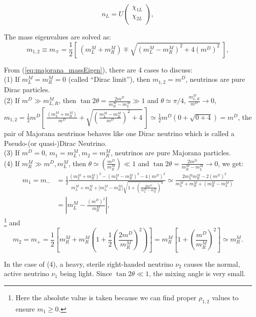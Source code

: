 \begin{equation}\label{eq:majorana_fields}
n_L=U
\begin{pmatrix}
\chi_{1L}\\
\chi_{2L}\\
\end{pmatrix},
\end{equation}

The mass eigenvalues are solved as:
\begin{equation}
m_{1,2}\equiv m_{\mp} = \frac{1}{2}[~(m_L^M+m_R^M)\mp\sqrt{(m_L^M-m_R^M)^2+4(m^D)^2}~]\label{eq:majorana_massEigen},
\end{equation}

From (\ref{eq:majorana_massEigen}), there are 4 cases to discuss:\\
(1) If $m_L^M=m_R^M=0$ (called ``Dirac limit''), then $m_{1,2}=m^D$, neutrinos are pure Dirac particles.\\
(2) If $m^D\gg m^M_{L,R}$, then $\tan 2\theta=\frac{2m^D}{m^M_R-m^M_L}\gg 1$ and $\theta\simeq \pi/4$, $\frac{m_{L,R}^M}{m^D}\to 0$, $m_{1,2}=\frac{1}{2}m^D[~\frac{(m_L^M+m_R^M)}{m^D}+\sqrt{(\frac{m^M_L-m^M_R}{m^D})^2+4}~]\simeq\frac{1}{2}m^D(0+\sqrt{0+4})= m^D$, the pair of Majorana neutrinos behaves like one Dirac neutrino which is called a Pseudo-(or quasi-)Dirac Neutrino.
\\
(3) If $m^D=0$, $m_1=m^M_L, m_2=m^M_R$, neutrinos are pure Majorana particles.\\
(4) If $m_R^M\gg m^D, m_L^M$, then $\theta\simeq(\frac{m^D}{m_R^M})\ll 1$ and $\tan 2\theta=\frac{2m^D}{m^M_R-m^M_L}\to 0$, we get:
\begin{equation}
\begin{aligned}
m_1=m_-&=\frac{1}{2}\frac{(m^M_L+m^M_R)^2-(m^M_L-m^M_R)^2-4(m^D)^2}{m^M_L+m^M_R+|m^M_L-m^M_R|\sqrt{1+(\frac{2m^D}{m^M_L-m^M_R})^2}}\simeq 
\frac{2m^M_Lm^M_R-2(m^D)^2}{m_L^M+m_R^M+(m_R^M-m_L^M)}\\
&=|m^M_L-\frac{(m^D)^2}{m^M_R}|,
\end{aligned}
\end{equation}\footnote{Here the absolute value is taken because we can find proper $\rho_{1,2}$ values to ensure $m_1\geq 0$.}
and
\begin{equation}
m_2=m_+=\frac{1}{2}[m^M_R+m^M_R(1+\frac{1}{2}(\frac{2m^D}{m^M_R})^2)]=m^M_R[1+(\frac{m^D}{m^M_R})^2]\simeq m^M_R.
\end{equation}

In the case of (4), a heavy, sterile right-handed neutrino $\nu_2$ causes the normal, active neutrino $\nu_1$ being light.
Since $\tan 2\theta\ll 1$, the mixing angle is very small.
 
